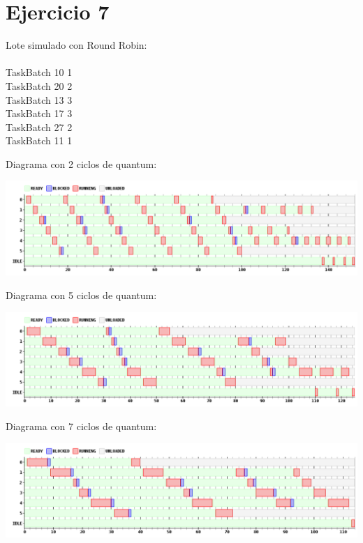 \section{Ejercicio 7}


Lote simulado con Round Robin:\\\\

TaskBatch 10 1\\
TaskBatch 20 2\\
TaskBatch 13 3\\
TaskBatch 17 3\\
TaskBatch 27 2\\
TaskBatch 11 1\\

\par Diagrama con 2 ciclos de quantum:

\begin {center}
\includegraphics[width=16cm]{../simusched/outputs/ej7/rr-ej7-1-2.png}
\end {center}

\par Diagrama con 5 ciclos de quantum:
\begin {center}
\includegraphics[width=16cm]{../simusched/outputs/ej7/rr-ej7-1-5.png}
\end {center}

\par Diagrama con 7 ciclos de quantum:
\begin {center}
\includegraphics[width=16cm]{../simusched/outputs/ej7/rr-ej7-1-7.png}
\end {center}

